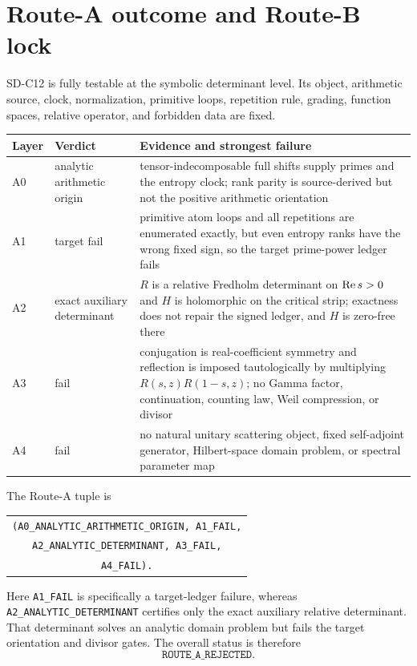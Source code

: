\section{Route-A outcome and Route-B lock}
\label{sec:route}

SD-C12 is fully testable at the symbolic determinant level.  Its object,
arithmetic source, clock, normalization, primitive loops, repetition rule,
grading, function spaces, relative operator, and forbidden data are fixed.

\begin{center}\small
\begin{tabularx}{0.99\textwidth}{L{0.08\textwidth}L{0.27\textwidth}X}
\toprule
Layer & Verdict & Evidence and strongest failure\\\midrule
A0 & analytic arithmetic origin & tensor-indecomposable full shifts supply primes and the entropy clock; rank parity is source-derived but not the positive arithmetic orientation\\
A1 & target fail & primitive atom loops and all repetitions are enumerated exactly, but even entropy ranks have the wrong fixed sign, so the target prime-power ledger fails\\
A2 & exact auxiliary determinant & $R$ is a relative Fredholm determinant on $\operatorname{Re} s>0$ and $H$ is holomorphic on the critical strip; exactness does not repair the signed ledger, and $H$ is zero-free there\\
A3 & fail & conjugation is real-coefficient symmetry and reflection is imposed tautologically by multiplying $R(s,z)R(1-s,z)$; no Gamma factor, continuation, counting law, Weil compression, or divisor\\
A4 & fail & no natural unitary scattering object, fixed self-adjoint generator, Hilbert-space domain problem, or spectral parameter map\\
\bottomrule
\end{tabularx}
\end{center}

The Route-A tuple is
\begin{center}\small
\begin{tabular}{c}
\texttt{(A0\_ANALYTIC\_ARITHMETIC\_ORIGIN, A1\_FAIL,}\\
\texttt{A2\_ANALYTIC\_DETERMINANT, A3\_FAIL,}\\
\texttt{A4\_FAIL).}
\end{tabular}
\end{center}
Here \texttt{A1\_FAIL} is specifically a target-ledger failure, whereas
\texttt{A2\_ANALYTIC\_DETERMINANT} certifies only the exact auxiliary relative
determinant.  That determinant solves an analytic domain problem but fails the
target orientation and divisor gates.  The overall status is therefore
\[
 \boxed{\texttt{ROUTE\_A\_REJECTED}.}                             \tag{8.1}
\]

